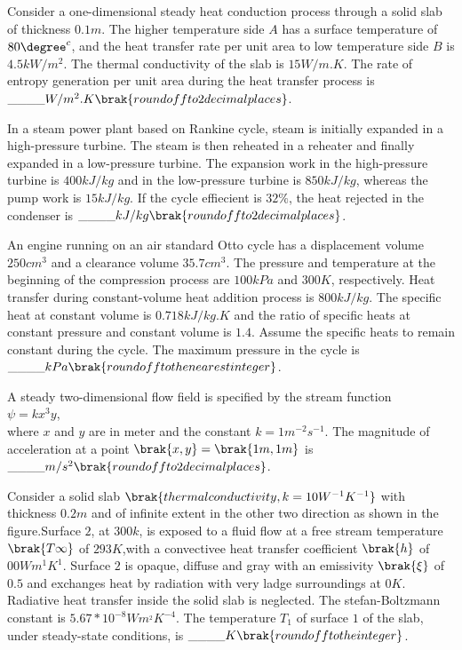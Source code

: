      \item Consider a one-dimensional steady heat conduction process through a solid slab of 
     thickness $0.1 m$. The higher temperature side $A$ has a surface temperature of $80\degree^{c}$, and the heat transfer rate per unit area to low temperature side $B$ is$ 4.5 kW/m^{2}$. The thermal conductivity of the slab is $15 W/m.K$. The rate of entropy generation per unit area during the heat transfer process is $\_\_\_\_ W/m^{2}.K \brak{round off to 2 decimal places}$.\\
     \item In a steam power plant based on Rankine cycle, steam is initially expanded in a 
     high-pressure turbine. The steam is then reheated in a reheater and finally expanded in a low-pressure turbine. The expansion work in the high-pressure turbine is $400 kJ/kg$ and in the low-pressure turbine is $850 kJ/kg$, whereas the pump work is $15 kJ/kg$. If the cycle effiecient is $32\%$, the heat rejected in the condenser is $\_\_\_\_kJ/kg \brak{round off to 2 decimal places}$.\\
     \item An engine running on an air standard Otto cycle has a displacement volume $250 cm^{3}$
     and a clearance volume $35.7 cm^{3}$. The pressure and temperature at the beginning of the compression process are $100 kPa$ and $300 K$, respectively. Heat transfer during constant-volume heat addition process is $800 kJ/kg$. The specific heat at constant volume is $0.718 kJ/kg.K$ and the ratio of specific heats at constant pressure and constant volume is $1.4$. Assume the specific heats to remain constant during the cycle. The maximum pressure in the cycle is$\_\_\_\_ kPa \brak{round off to the nearest integer}$.\\
     \item A steady two-dimensional flow field is specified by the stream function\\
                      $\psi=kx^{3}y$,\\
     where $x$ and $y$ are in meter and the constant $k=1 m^{-2}s^{-1}$. The magnitude of acceleration at a point $\brak{x,y}=\brak{1 m,1 m}$ is $\_\_\_\_m/s^{2} \brak{round off to 2 decimal places}$.\\
     \item Consider a solid slab $\brak{thermal conductivity, k=10 W^{-1}K^{-1}}$ with thickness $0.2 m$ and of infinite extent in the other two direction as shown in the figure.Surface $2$, at $300 k$, is exposed to a fluid flow at a free stream temperature $\brak{T\infty}$ of $293 K$,with a convectivee heat transfer coefficient $\brak{h}$ of $00 Wm^{1}K^{1}$. Surface $2$ is opaque, diffuse and gray with an emissivity $\brak{\xi}$ of $0.5$ and exchanges heat by radiation with very ladge surroundings at $0 K$. Radiative heat transfer inside the solid slab is neglected. The stefan-Boltzmann constant is $5.67*10^{-8}Wm^{_2}K^{-4}$. The temperature $T_{1}$ of surface $1$ of the slab, under steady-state conditions, is $\_\_\_\_K \brak{round off to the integer}$.\\

